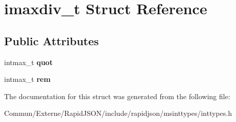 \hypertarget{structimaxdiv__t}{}\section{imaxdiv\+\_\+t Struct Reference}
\label{structimaxdiv__t}
\subsection*{Public Attributes}
\begin{DoxyCompactItemize}
\item 
intmax\+\_\+t {\bfseries quot}\hypertarget{structimaxdiv__t_a9339814cbb7610c72fb7d30c6573b393}{}\label{structimaxdiv__t_a9339814cbb7610c72fb7d30c6573b393}

\item 
intmax\+\_\+t {\bfseries rem}\hypertarget{structimaxdiv__t_a6c9701ad10bff81edae7ff679cae7850}{}\label{structimaxdiv__t_a6c9701ad10bff81edae7ff679cae7850}

\end{DoxyCompactItemize}


The documentation for this struct was generated from the following file\+:\begin{DoxyCompactItemize}
\item 
Commun/\+Externe/\+Rapid\+J\+S\+O\+N/include/rapidjson/msinttypes/inttypes.\+h\end{DoxyCompactItemize}
